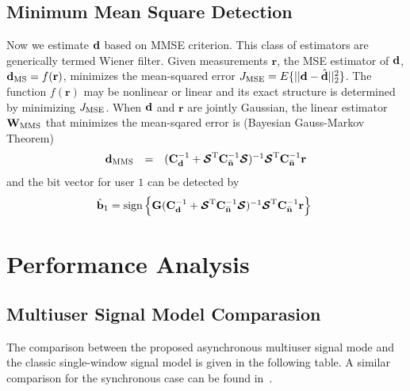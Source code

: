 \documentclass[a4paper,10pt,fleqn, twocolumn]{IEEETran}
\newcommand{\br}{{\mathbf r}}
\newcommand{\bb}{{\bf b}}
\newcommand{\bC}{{\bf C}}
\newcommand{\bG}{{\bf G}}
\newcommand{\bn}{{\bf n}}
\newcommand{\bbf}{{\bf d}}
\newcommand{\bW}{{\bf W}}
\newcommand{\bcS}{{\mbox {\boldmath ${\cal S}$}}}
\begin{document}
\subsection{Minimum Mean Square Detection}
Now we estimate $\bbf$ based on MMSE criterion. This class of
estimators are generically termed Wiener filter. Given
measurements $\br$, the MSE estimator of $\bbf$, ${\bbf}_{\rm MS}
= f( \br )$, minimizes the mean-squared error $J_{\rm
MSE}=E\{||\bbf-\hat{\bbf}||_2^2\}$. The function $f(\br)$ may be
nonlinear or linear and its exact structure is determined by
minimizing $J_{\rm MSE}$. When $\bbf$ and $\br$ are jointly
Gaussian, the linear estimator $\bW_{\rm MMS}$ that minimizes the
mean-sqared error is (Bayesian Gauss-Markov Theorem)
\begin{equation}
\begin{array}{rcl}
{\bbf}_{\rm MMS}&=&(\bC_{\bbf}^{-1}+\bcS^{\rm
T}\bC_{\bar{\bn}}^{-1}\bcS)^{-1}\bcS^{\rm
T}\bC_{\bar{\bn}}^{-1}\br
\end{array} \label{MSE}
\end{equation}
\noindent and the bit vector for user $1$ can be detected by
\begin{equation}\hspace{-0.05in}
\begin{array}{l}
\hat{\bb}_1=\mbox{sign}\left\{\bG(\bC_{\bbf}^{-1}+\bcS^{\rm
T}\bC_{\bar{\bn}}^{-1}\bcS)^{-1}\bcS^{\rm
T}\bC_{\bar{\bn}}^{-1}\br\right\}
\end{array}
\end{equation}

\section{Performance Analysis}
\subsection{Multiuser Signal Model Comparasion}
The comparison between the proposed asynchronous multiuser signal
mode and the classic single-window signal model is given in the
following table. A similar comparison for the synchronous case can
be found in~\cite{Shen05}.
\end{document}
